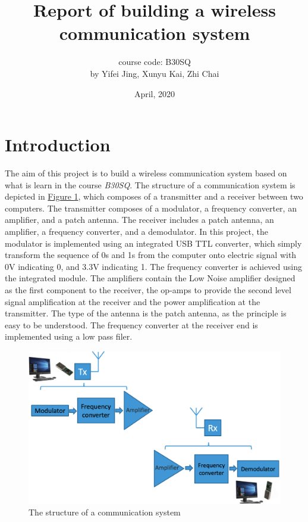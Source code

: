 \documentclass[12pt,a4paper]{report}
\begin{document}
    \title{Report of building a wireless communication system}

    \author{course code: B30SQ \\ by Yifei Jing, Xunyu Kai, Zhi Chai}
    \date{April, 2020}
    \maketitle
    \setlength\parindent{0pt}

\chapter*{Introduction}
The aim of this project is to build a wireless communication system based on what is learn in the course \emph{B30SQ}.
The structure of a communication system is depicted in \hyperref[fig:system_structure]{Figure \ref*{fig:system_structure}}, which composes of a transmitter and a receiver between two computers.
The transmitter composes of a modulator, a frequency converter, an amplifier, and a patch antenna. The receiver includes a patch antenna, an amplifier, a frequency converter, and a demodulator.
In this project, the modulator is implemented using an integrated USB TTL converter, which simply transform the sequence of 0s and 1s from the computer onto electric signal with 0V indicating 0, and 3.3V indicating 1. The frequency converter is achieved using the integrated module.
The amplifiers contain the Low Noise amplifier designed as the first component to the receiver, the op-amps to provide the second level signal amplification at the receiver and the power amplification at the transmitter.
The type of the antenna is the patch antenna, as the principle is easy to be understood. The frequency converter at the receiver end is implemented using a low pass filer.

\begin{figure}[ht]
    \centerline{\includegraphics[scale=1]{system_structure}}
    \caption{The structure of a communication system}
    \label{fig:system_structure}
\end{figure}
\end{document}
